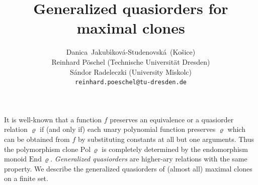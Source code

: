 \documentclass[a4paper]{article} %
\date{} %
\begin{document}
\setcounter{page}{1} %

\title{Generalized quasiorders for maximal clones}

\author{Danica~Jakub{\'\i}kov{\'a}{-}Studenovsk{\'a}\
        (Ko\v{s}ice)\\
       Reinhard P{\"o}schel 
       (Technische Universit{\"a}t Dresden)\\
       S{\'andor} Radeleczki (University Miskolc)\\
       \texttt{reinhard.poeschel@tu-dresden.de} %
       }%

\maketitle


It is well-known that a function $f$ preserves an
equivalence or a quasiorder relation $\varrho$ if (and only if) each
unary polynomial function preserves $\varrho$ which can be obtained from
$f$ by substituting constants at all but one arguments. Thus the
polymorphism clone $\mathrm{Pol}\,\varrho$ is completely determined by the
endomorphism monoid $\mathrm{End}\,\varrho$. 
\emph{Generalized quasiorders} are higher-ary relations with the same property.
We describe the generalized quasiorders of (almost all) maximal
clones on a finite set.
\end{document}
